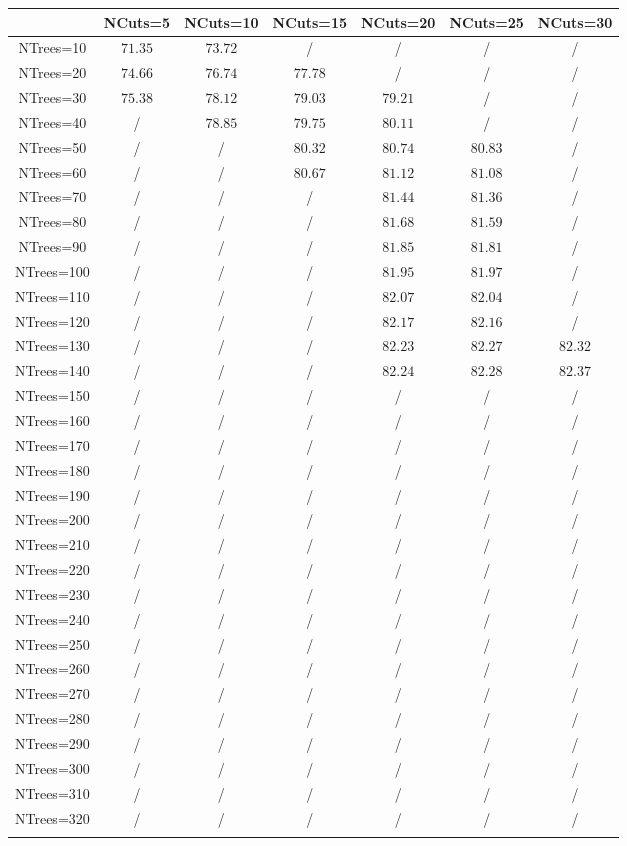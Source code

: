 \centering
\begin{tabular}{ccccccc} \toprule\toprule
 & NCuts=5 & NCuts=10 & NCuts=15 & NCuts=20 & NCuts=25 & NCuts=30\\\midrule
NTrees=10 & $71.35$ & $73.72$ &  / &  / &  / &  /\\
NTrees=20 & $74.66$ & $76.74$ & $77.78$ &  / &  / &  /\\
NTrees=30 & $75.38$ & $78.12$ & $79.03$ & $79.21$ &  / &  /\\
NTrees=40 &  / & $78.85$ & $79.75$ & $80.11$ &  / &  /\\
NTrees=50 &  / &  / & $80.32$ & $80.74$ & $80.83$ &  /\\
NTrees=60 &  / &  / & $80.67$ & $81.12$ & $81.08$ &  /\\
NTrees=70 &  / &  / &  / & $81.44$ & $81.36$ &  /\\
NTrees=80 &  / &  / &  / & $81.68$ & $81.59$ &  /\\
NTrees=90 &  / &  / &  / & $81.85$ & $81.81$ &  /\\
NTrees=100 &  / &  / &  / & $81.95$ & $81.97$ &  /\\
NTrees=110 &  / &  / &  / & $82.07$ & $82.04$ &  /\\
NTrees=120 &  / &  / &  / & $82.17$ & $82.16$ &  /\\
NTrees=130 &  / &  / &  / & $82.23$ & $82.27$ & $82.32$\\
NTrees=140 &  / &  / &  / & $82.24$ & $82.28$ & $82.37$\\
NTrees=150 &  / &  / &  / &  / &  / &  /\\
NTrees=160 &  / &  / &  / &  / &  / &  /\\
NTrees=170 &  / &  / &  / &  / &  / &  /\\
NTrees=180 &  / &  / &  / &  / &  / &  /\\
NTrees=190 &  / &  / &  / &  / &  / &  /\\
NTrees=200 &  / &  / &  / &  / &  / &  /\\
NTrees=210 &  / &  / &  / &  / &  / &  /\\
NTrees=220 &  / &  / &  / &  / &  / &  /\\
NTrees=230 &  / &  / &  / &  / &  / &  /\\
NTrees=240 &  / &  / &  / &  / &  / &  /\\
NTrees=250 &  / &  / &  / &  / &  / &  /\\
NTrees=260 &  / &  / &  / &  / &  / &  /\\
NTrees=270 &  / &  / &  / &  / &  / &  /\\
NTrees=280 &  / &  / &  / &  / &  / &  /\\
NTrees=290 &  / &  / &  / &  / &  / &  /\\
NTrees=300 &  / &  / &  / &  / &  / &  /\\
NTrees=310 &  / &  / &  / &  / &  / &  /\\
NTrees=320 &  / &  / &  / &  / &  / &  /\\
\bottomrule\bottomrule\\
\end{tabular}
